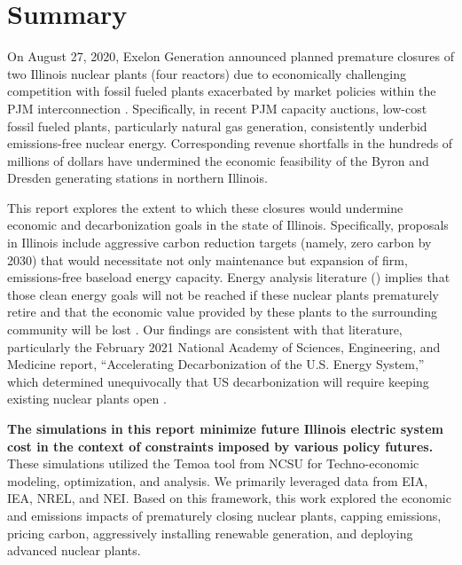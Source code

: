 \section{Summary}
On August 27, 2020, Exelon Generation announced planned premature closures of 
two Illinois nuclear plants (four reactors) due to economically challenging 
competition with fossil fueled plants exacerbated by market policies within the 
\gls{PJM} interconnection \cite{larson_exelon_2020}. Specifically, in recent 
\gls{PJM} capacity auctions, low-cost fossil fueled plants, particularly 
natural gas generation, consistently underbid emissions-free nuclear energy.  
Corresponding revenue shortfalls in the hundreds of millions of dollars have 
undermined the economic feasibility of the Byron and Dresden generating 
stations in northern Illinois.

This report explores the extent to which these closures would undermine 
economic and decarbonization goals in the state of Illinois.  Specifically, 
proposals in Illinois include aggressive carbon reduction targets (namely, zero carbon by 2030) 
that would necessitate not only maintenance but expansion of firm, 
emissions-free baseload energy capacity. Energy analysis literature 
(\cite{national_accelerating_2021,larson_net-zero_2020,others}) implies that those clean energy 
goals will not be reached if these nuclear plants prematurely retire and that 
the economic value provided by these plants to the surrounding community will 
be lost \cite{economic_impact_studies}. 
Our findings are consistent with that literature, particularly the February 
2021 National Academy of Sciences, Engineering, and Medicine report, 
``Accelerating Decarbonization of the U.S. Energy System,'' which determined 
unequivocally that US decarbonization will require keeping existing nuclear 
plants open \cite{national_accelerating_2021}.

\textbf{The simulations in this report minimize future Illinois electric system cost 
in the context of constraints imposed by various policy futures.} These simulations utilized the 
Temoa tool from \gls{NCSU} for Techno-economic modeling, optimization, and 
analysis. We primarily leveraged data from \gls{EIA}, \gls{IEA}, 
\gls{NREL}, and \gls{NEI}. Based on this framework, this work explored the economic 
and emissions impacts of prematurely closing nuclear plants, capping 
emissions, pricing carbon, aggressively installing renewable generation, and deploying advanced nuclear plants.


